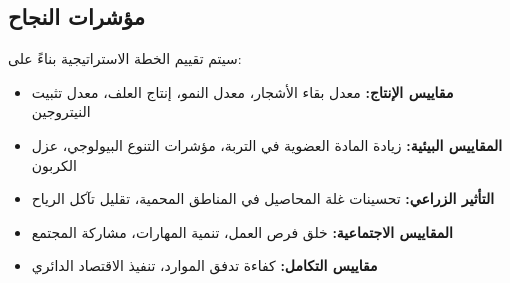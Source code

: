 \subsection{مؤشرات النجاح}

سيتم تقييم الخطة الاستراتيجية بناءً على:

\begin{itemize}
    \item \textbf{مقاييس الإنتاج:} معدل بقاء الأشجار، معدل النمو، إنتاج العلف، معدل تثبيت النيتروجين
    \item \textbf{المقاييس البيئية:} زيادة المادة العضوية في التربة، مؤشرات التنوع البيولوجي، عزل الكربون
    \item \textbf{التأثير الزراعي:} تحسينات غلة المحاصيل في المناطق المحمية، تقليل تآكل الرياح
    \item \textbf{المقاييس الاجتماعية:} خلق فرص العمل، تنمية المهارات، مشاركة المجتمع
    \item \textbf{مقاييس التكامل:} كفاءة تدفق الموارد، تنفيذ الاقتصاد الدائري
\end{itemize}
